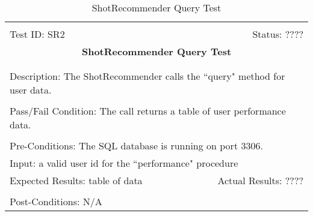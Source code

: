 \documentclass[11pt]{article}
\begin{document}
\begin{center}
\begin{table}[H]
\begin{tabular}{|l r|}\hline&\\[-2mm]
	Test ID: SR2	&Status: ????\\[-3mm]
	\multicolumn{2}{|c|}{\textbf{\large{ShotRecommender Query Test}}}\\&\\\hline&\\[-3mm]
	\multicolumn{2}{|p{\textwidth}|}{Description: The ShotRecommender calls the ``query" method for user data.}\\[1mm]\hline&\\[-3mm]
	\multicolumn{2}{|p{\textwidth}|}{Pass/Fail Condition: The call returns a table of user performance data.}\\[1mm]\hline&\\[-3mm]
	\multicolumn{2}{|p{\textwidth}|}{Pre-Conditions: The SQL database is running on port 3306.}\\[4mm]
	\multicolumn{2}{|p{\textwidth}|}{Input: a valid user id for the ``performance" procedure}\\[2mm]\hline
	\multicolumn{1}{|p{0.49\textwidth}}{Expected Results: table of data}	&\multicolumn{1}{|p{0.45\textwidth}|}{Actual Results: ????}\\\hline&\\[-3mm]
	\multicolumn{2}{|p{\textwidth}|}{Post-Conditions: N/A}\\\hline
\end{tabular}
\caption{ShotRecommender Query Test}
\end{table}
\end{center}
\end{document}
